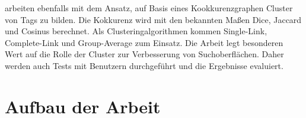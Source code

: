 \textcite{kss2010} arbeiten ebenfalls mit dem Ansatz, auf Basis eines Kookkurenzgraphen Cluster von Tags zu bilden. Die Kokkurenz wird mit den bekannten Maßen Dice, Jaccard und Cosinus berechnet. Als Clusteringalgorithmen kommen Single-Link, Complete-Link und Group-Average zum Einsatz. Die Arbeit legt besonderen Wert auf die Rolle der Cluster zur Verbesserung von Suchoberflächen. Daher werden auch Tests mit Benutzern durchgeführt und die Ergebnisse evaluiert.

\section{Aufbau der Arbeit}